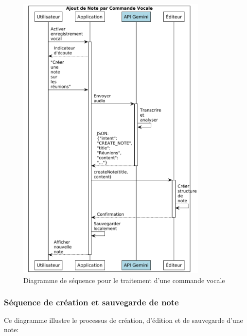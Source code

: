 \begin{figure}[H]
    \centering
    \includegraphics[width=0.85\textwidth]{assets/docs/voicenotion_sequence_voice.png}
    \caption{Diagramme de séquence pour le traitement d'une commande vocale}
    \label{fig:sequence_voice_command}
\end{figure}

\subsubsection{Séquence de création et sauvegarde de note}

Ce diagramme illustre le processus de création, d'édition et de sauvegarde d'une note:

